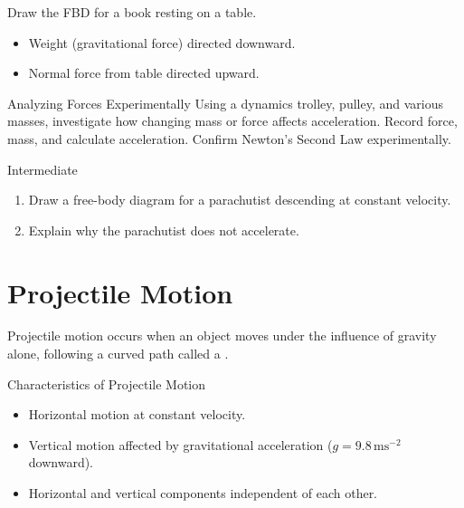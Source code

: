 \begin{example}
Draw the FBD for a book resting on a table.
\begin{itemize}
    \item Weight (gravitational force) directed downward.
    \item Normal force from table directed upward.
\end{itemize}
\end{example}

\begin{investigation}{Analyzing Forces Experimentally}
Using a dynamics trolley, pulley, and various masses, investigate how changing mass or force affects acceleration. Record force, mass, and calculate acceleration. Confirm Newton's Second Law experimentally.
\end{investigation}

\FloatBarrier

\begin{tieredquestions}{Intermediate}
\begin{enumerate}
    \item Draw a free-body diagram for a parachutist descending at constant velocity.
    \item Explain why the parachutist does not accelerate.
\end{enumerate}
\end{tieredquestions}

\section{Projectile Motion}
\FloatBarrier

Projectile motion occurs when an object moves under the influence of gravity alone, following a curved path called a .

\begin{keyconcept}{Characteristics of Projectile Motion}
\begin{itemize}
    \item Horizontal motion at constant velocity.
    \item Vertical motion affected by gravitational acceleration ($g = 9.8\,\text{ms}^{-2}$ downward).
    \item Horizontal and vertical components independent of each other.
\end{itemize}
\end{keyconcept}



